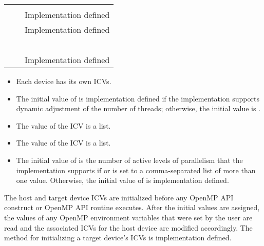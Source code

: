 \begin{supertabular}{p{1.4in} p{1.8in} p{1.5in}}
{}  & {}  & {}         \\
{}   & {}   & Implementation defined \\
{}    & {}    & Implementation defined \\
{}    & {}    & {}      \\
{} & {} & {}          \\
{}              & {}              & {}       \\
{}    & {}    & {}  \\
{}             & {}             & {}      \\
{}     & {}         & Implementation defined \\
\end{supertabular}

\linenumbers

\descr

\begin{itemize}
\item Each device has its own ICVs.
\item The initial value of  is implementation defined if the 
      implementation supports dynamic adjustment of the number of threads; 
      otherwise, the initial value is .
\item The value of the  ICV is a list.
\item The value of the  ICV is a list.
\item The initial value of  is the number of 
      active levels of parallelism that the implementation supports if
       or  is set to a comma-separated
      list of more than one value. Otherwise, the initial value of
       is implementation defined.
\end{itemize}

The host and target device ICVs are initialized before any OpenMP API construct or
OpenMP API routine executes. After the initial values are assigned, the values of any
OpenMP environment variables that were set by the user are read and the associated
ICVs for the host device are modified accordingly. The method for initializing a target
device's ICVs is implementation defined.

